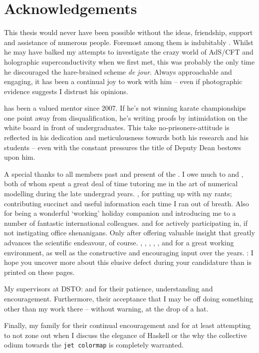 \chapter{Acknowledgements}

This thesis would never have been possible without the ideas, friendship, support and assistance of numerous people.
Foremost among them is indubitably .
Whilst he may have balked my attempts to investigate the crazy world of AdS/CFT and holographic superconductivity when we first met, this was probably the only time he discouraged the hare-brained scheme \emph{de jour}.
Always approachable and engaging, it has been a continual joy to work with him -- even if photographic evidence suggests I distrust his opinions.

 has been a valued mentor since 2007.
If he's not winning karate championships one point away from disqualification, he's writing proofs by intimidation on the white board in front of undergraduates.
This take no-prisoners-attitude is reflected in his dedication and meticulousness towards both his research and his students -- even with the constant pressures the title of Deputy Dean bestows upon him.

A special thanks to all members past and present of the .
I owe much to  and , both of whom spent a great deal of time tutoring me in the art of numerical modelling during the late undergrad years.
, for putting up with my rants; contributing succinct and useful information each time I ran out of breath.
Also for being a wonderful `working' holiday companion and introducing me to a number of fantastic international colleagues.
 and  for actively participating in, if not instigating office shenanigans.
Only after offering valuable insight that greatly advances the scientific endeavour, of course.
, , , ,  ,  and  for a great working environment, as well as the constructive and encouraging input over the years.
: I hope you uncover more about this elusive defect during your candidature than is printed on these pages.

My supervisors at DSTO: %
%
 and  for their patience, understanding and encouragement. 
Furthermore, their acceptance that I may be off doing something other than my work there -- without warning, at the drop of a hat.

Finally, my family for their continual encouragement and for at least attempting to not zone out when I discuss the elegance of Haskell or the why the collective odium towards the \texttt{jet colormap} is completely warranted. 